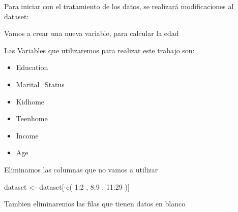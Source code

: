 \documentclass[Iberoamerican Journal of Industrial
Engineering,article,submit,moreauthors,pdftex]{Definitions/mdpi}
\newenvironment{Shaded}{\begin{snugshade}}{\end{snugshade}}
\newcommand{\DecValTok}[1]{\textcolor[rgb]{0.00,0.00,0.81}{#1}}
\newcommand{\FunctionTok}[1]{\textcolor[rgb]{0.00,0.00,0.00}{#1}}
\newcommand{\NormalTok}[1]{#1}
\newcommand{\OtherTok}[1]{\textcolor[rgb]{0.56,0.35,0.01}{#1}}
\newcommand{\SpecialCharTok}[1]{\textcolor[rgb]{0.00,0.00,0.00}{#1}}
\providecommand{\tightlist}{%
  \setlength{\itemsep}{0pt}\setlength{\parskip}{0pt}}
\begin{document}
Para iniciar con el tratamiento de los datos, se realizará
modificaciones al dataset:

Vamos a crear una nueva variable, para calcular la edad

\begin{Shaded}
\end{Shaded}

Las Variables que utilizaremos para realizar este trabajo son:

\begin{itemize}
\tightlist
\item
  Education
\item
  Marital\_Status
\item
  Kidhome
\item
  Teenhome
\item
  Income
\item
  Age
\end{itemize}

Eliminamos las columnas que no vamos a utilizar

\begin{Shaded}
\begin{Highlighting}[]
\NormalTok{dataset }\OtherTok{\textless{}{-}}\NormalTok{ dataset[}\SpecialCharTok{{-}}\FunctionTok{c}\NormalTok{( }\DecValTok{1}\SpecialCharTok{:}\DecValTok{2}\NormalTok{ , }\DecValTok{8}\SpecialCharTok{:}\DecValTok{9}\NormalTok{ , }\DecValTok{11}\SpecialCharTok{:}\DecValTok{29}\NormalTok{ )]}
\end{Highlighting}
\end{Shaded}

Tambien eliminaremos las filas que tienen datos en blanco

\begin{Shaded}
\end{Shaded}
\end{document}
